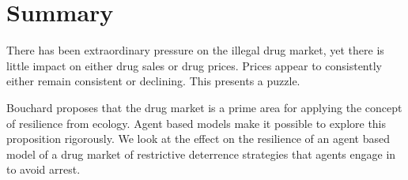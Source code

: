 \documentclass[runningheads,a4paper]{llncs}
\begin{document}

%
%


\section{Summary}

There has been extraordinary pressure on the illegal drug market, yet there is
little impact on either drug sales or drug prices. Prices appear to consistently either remain consistent or declining. This presents a puzzle.

Bouchard proposes that the drug market is a prime area for applying the concept of resilience from ecology. Agent based models make it possible to explore this proposition rigorously. We look at the effect on the resilience of an agent based model of a drug market of restrictive deterrence strategies that agents engage in to avoid arrest.
\end{document}
